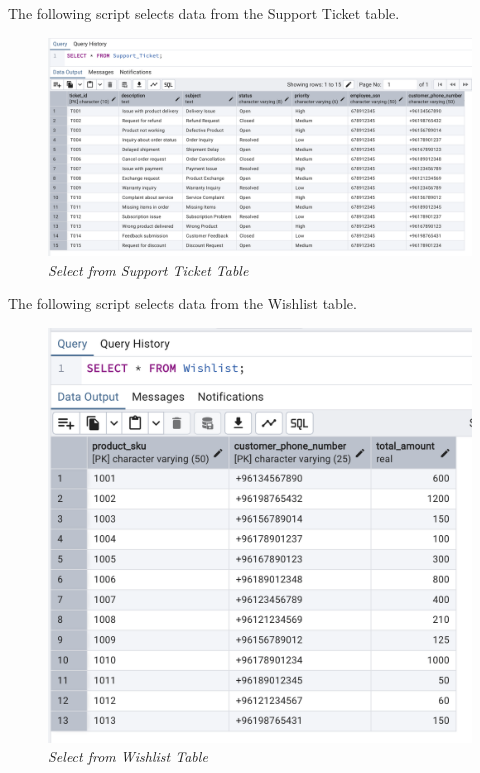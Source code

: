 The following script selects data from the Support Ticket table.


\begin{figure}[H]
  \centering
  \includegraphics[width=1\textwidth]{images/sql/select/support_ticket.png}
  \caption{\textit{Select from Support Ticket Table}}
\end{figure}

The following script selects data from the Wishlist table.


\begin{figure}[H]
  \centering
  \includegraphics[width=1\textwidth]{images/sql/select/wishlist.png}
  \caption{\textit{Select from Wishlist Table}}
\end{figure}

